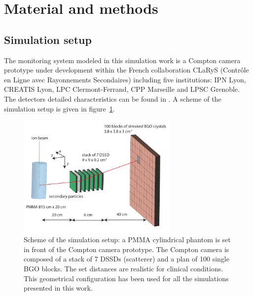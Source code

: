 
\section{Material and methods}

\subsection{Simulation setup}

The monitoring system modeled in this simulation work is a Compton camera prototype under development within the French collaboration CLaRyS (Contr\^ole en Ligne avec Rayonnements Secondaires) including five institutions: IPN Lyon, CREATIS Lyon, LPC Clermont-Ferrand, CPP Marseille and LPSC Grenoble. The detectors detailed characteristics can be found in \cite{krimmer:hal-01101334}. A scheme of the simulation setup is given in figure~\ref{fig:fig_setup_CC_simulation_Hadronth}.

\begin{figure} [!hbtp]	
  \centering
  \includegraphics[width=0.7\textwidth]{./Figure/Compton_Camera_hadontherapy_PMMA_Cylinder_EN.pdf}
  \caption{Scheme of the simulation setup: a PMMA cylindrical phantom is set in front of the Compton camera prototype. The Compton camera is composed of a stack of 7 DSSDs (scatterer) and a plan of 100 single BGO blocks. The set distances are realistic for clinical conditions. This geometrical configuration has been used for all the simulations presented in this work.}
  \label{fig:fig_setup_CC_simulation_Hadronth}
\end{figure}


